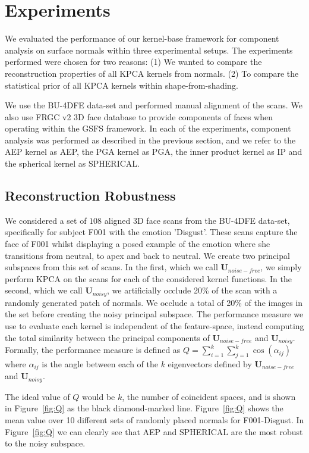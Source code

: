 \section{Experiments}\label{sec:experiments}
We evaluated the performance of our kernel-base framework for component analysis on surface normals within three experimental setups. The experiments performed were chosen for two reasons: (1) We wanted to compare the reconstruction properties of all KPCA kernels from normals. (2) To compare the statistical prior of all KPCA kernels within shape-from-shading. 

We use the BU-4DFE data-set \cite{RefWorks:104} and performed manual alignment of the scans. We also use FRGC v2 3D face database \cite{RefWorks:251} to provide components of faces when operating within the GSFS framework. In each of the experiments, component analysis was performed as described in the previous section, and we refer to the AEP kernel as AEP, the PGA kernel as PGA, the inner product kernel as IP and the spherical kernel as SPHERICAL.
\subsection{Reconstruction Robustness}\label{subsec:Q}
We considered a set of $108$ aligned 3D face scans from the BU-4DFE data-set, specifically for subject F001 with the emotion 'Disgust'. These scans capture the face of F001 whilst displaying a posed example of the emotion where she transitions from neutral, to apex and back to neutral. We create two principal subspaces from this set of scans. In the first, which we call $\boldsymbol{U}_{noise-free}$, we simply perform KPCA on the scans for each of the considered kernel functions. In the second, which we call $\boldsymbol{U}_{noisy}$, we artificially occlude 20\% of the scan with a randomly generated patch of normals. We occlude a total of 20\% of the images in the set before creating the noisy principal subspace. The performance measure we use to evaluate each kernel is independent of the feature-space, instead computing the total similarity between the principal components of $\boldsymbol{U}_{noise-free}$ and $\boldsymbol{U}_{noisy}$. Formally, the performance measure is defined as $Q = \sum_{i=1}^k \sum_{j=1}^k \cos(\alpha_{ij})$ where $\alpha_{ij}$ is the angle between each of the $k$ eigenvectors defined by $\boldsymbol{U}_{noise-free}$ and $\boldsymbol{U}_{noisy}$. 

The ideal value of $Q$ would be $k$, the number of coincident spaces, and is shown in Figure~\ref{fig:Q} as the black diamond-marked line. Figure~\ref{fig:Q} shows the mean value over 10 different sets of randomly placed normals for F001-Disgust. In Figure~\ref{fig:Q} we can clearly see that AEP and SPHERICAL are the most robust to the noisy subspace.
